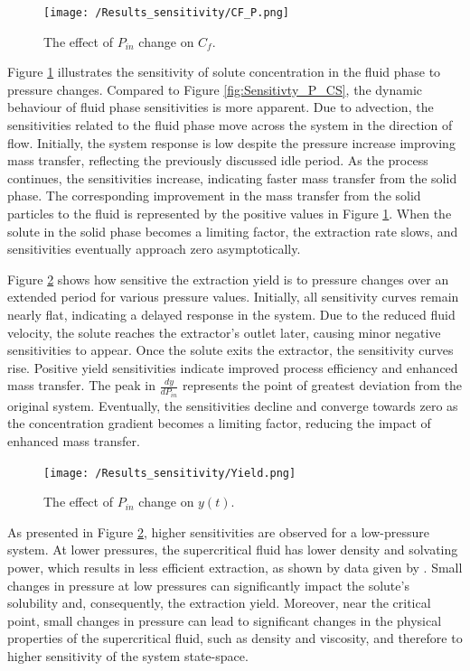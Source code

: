 \documentclass[a4paper,fleqn]{cas-dc}
\begin{document}
	\begin{figure}[!ht]
		\centering
		\texttt{[image: /Results\_sensitivity/CF\_P.png]}
		\caption{The effect of $P_{in}$ change on $C_f$.}
		\label{fig:Sensitivty_P_CF}
	\end{figure}
	
	
	Figure \ref{fig:Sensitivty_P_CF} illustrates the sensitivity of solute concentration in the fluid phase to pressure changes. Compared to Figure \ref{fig:Sensitivty_P_CS}, the dynamic behaviour of fluid phase sensitivities is more apparent. Due to advection, the sensitivities related to the fluid phase move across the system in the direction of flow. Initially, the system response is low despite the pressure increase improving mass transfer, reflecting the previously discussed idle period. As the process continues, the sensitivities increase, indicating faster mass transfer from the solid phase. The corresponding improvement in the mass transfer from the solid particles to the fluid is represented by the positive values in Figure \ref{fig:Sensitivty_P_CF}. When the solute in the solid phase becomes a limiting factor, the extraction rate slows, and sensitivities eventually approach zero asymptotically.
	
	Figure \ref{fig:Sensitivty_P_y} shows how sensitive the extraction yield is to pressure changes over an extended period for various pressure values. Initially, all sensitivity curves remain nearly flat, indicating a delayed response in the system. Due to the reduced fluid velocity, the solute reaches the extractor's outlet later, causing minor negative sensitivities to appear. Once the solute exits the extractor, the sensitivity curves rise. Positive yield sensitivities indicate improved process efficiency and enhanced mass transfer. The peak in $\frac{dy}{dP_{in}}$ represents the point of greatest deviation from the original system. Eventually, the sensitivities decline and converge towards zero as the concentration gradient becomes a limiting factor, reducing the impact of enhanced mass transfer.
	
	\begin{figure}[!ht]
		\centering
		\texttt{[image: /Results\_sensitivity/Yield.png]}
		\caption{The effect of $P_{in}$ change on $y(t)$.}
		\label{fig:Sensitivty_P_y}
	\end{figure}
	
	As presented in Figure \ref{fig:Sensitivty_P_y}, higher sensitivities are observed for a low-pressure system. At lower pressures, the supercritical fluid has lower density and solvating power, which results in less efficient extraction, as shown by data given by \citet{Sliczniuk2024}. Small changes in pressure at low pressures can significantly impact the solute's solubility and, consequently, the extraction yield. Moreover, near the critical point, small changes in pressure can lead to significant changes in the physical properties of the supercritical fluid, such as density and viscosity, and therefore to higher sensitivity of the system state-space.
	
\end{document}
